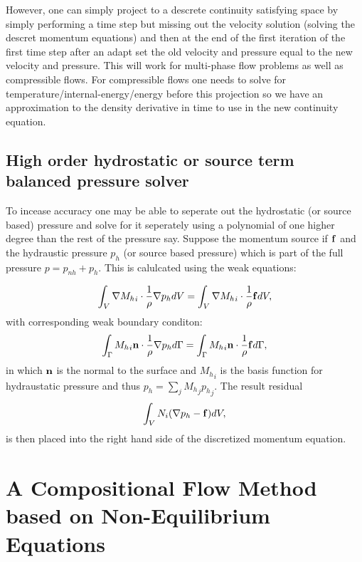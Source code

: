 However, one can simply project to a descrete continuity satisfying space by 
simply performing a time step but missing out the velocity solution (solving the 
descret momentum equations) and then at the end of the first iteration of the first time step 
after an adapt set the old velocity and pressure equal to the new velocity and pressure. 
This will work for multi-phase flow problems as well as compressible flows. For compressible 
flows one needs to solve for temperature/internal-energy/energy before 
this projection so we have an approximation to the density derivative in time to use in 
the new continuity equation. 


\subsection{High order hydrostatic or source term balanced pressure solver} 

To incease accuracy one may be able to seperate out the hydrostatic (or source based) 
pressure and solve for it seperately using a polynomial of one higher degree than the rest of the pressure say. 
Suppose the momentum source if ${\bf f}$ and the hydraustic 
pressure $p_h$ (or source based pressure) which is part of the full pressure $p=p_{nh} + p_h$. 
This is calulcated using the weak equations: 

\begin{equation}
\int_V \nabla {M_h}_i \cdot \frac{1}{\rho} \nabla p_h dV =  \int_V \nabla {M_h}_i \cdot \frac{1}{\rho} {\bf f} dV, 
\end{equation}
with corresponding weak boundary conditon:
\begin{equation}
 \int_{\Gamma} {M_h}_i {\bf n}\cdot\frac{1}{\rho} \nabla p_h d\Gamma = \int_{\Gamma} {M_h}_i {\bf n}\cdot \frac{1}{\rho}{\bf f} d\Gamma, 
\end{equation}
in which ${\bf n}$ is the normal to the surface and ${M_h}_i$ is the basis function for hydraustatic pressure 
and thus $p_h =\sum_j {M_h}_j {p_h}_j$. 
The result residual 
\begin{equation}
\int_V {N}_i ( \nabla p_h - {\bf f} ) dV, 
\end{equation}
is then placed into the right hand side of the discretized momentum equation. 




			

\pagebreak	


\section{A Compositional Flow 
Method based on Non-Equilibrium 
Equations}
\label{Compositional}

